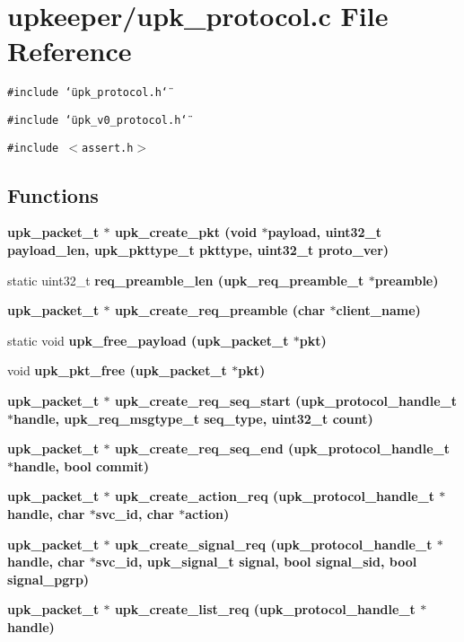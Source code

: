\section{upkeeper/upk\_\-protocol.c File Reference}
\label{upk__protocol_8c}
{\tt \#include \char`\"{}upk\_\-protocol.h\char`\"{}}\par
{\tt \#include \char`\"{}upk\_\-v0\_\-protocol.h\char`\"{}}\par
{\tt \#include $<$assert.h$>$}\par
\subsection*{Functions}
\begin{CompactItemize}
\item 
\bf{upk\_\-packet\_\-t} $\ast$ \bf{upk\_\-create\_\-pkt} (void $\ast$payload, uint32\_\-t payload\_\-len, \bf{upk\_\-pkttype\_\-t} pkttype, uint32\_\-t proto\_\-ver)
\item 
static uint32\_\-t \bf{req\_\-preamble\_\-len} (\bf{upk\_\-req\_\-preamble\_\-t} $\ast$preamble)
\item 
\bf{upk\_\-packet\_\-t} $\ast$ \bf{upk\_\-create\_\-req\_\-preamble} (char $\ast$client\_\-name)
\item 
static void \bf{upk\_\-free\_\-payload} (\bf{upk\_\-packet\_\-t} $\ast$pkt)
\item 
void \bf{upk\_\-pkt\_\-free} (\bf{upk\_\-packet\_\-t} $\ast$pkt)
\item 
\bf{upk\_\-packet\_\-t} $\ast$ \bf{upk\_\-create\_\-req\_\-seq\_\-start} (\bf{upk\_\-protocol\_\-handle\_\-t} $\ast$handle, \bf{upk\_\-req\_\-msgtype\_\-t} seq\_\-type, uint32\_\-t count)
\item 
\bf{upk\_\-packet\_\-t} $\ast$ \bf{upk\_\-create\_\-req\_\-seq\_\-end} (\bf{upk\_\-protocol\_\-handle\_\-t} $\ast$handle, bool commit)
\item 
\bf{upk\_\-packet\_\-t} $\ast$ \bf{upk\_\-create\_\-action\_\-req} (\bf{upk\_\-protocol\_\-handle\_\-t} $\ast$handle, char $\ast$svc\_\-id, char $\ast$action)
\item 
\bf{upk\_\-packet\_\-t} $\ast$ \bf{upk\_\-create\_\-signal\_\-req} (\bf{upk\_\-protocol\_\-handle\_\-t} $\ast$handle, char $\ast$svc\_\-id, \bf{upk\_\-signal\_\-t} signal, bool signal\_\-sid, bool signal\_\-pgrp)
\item 
\bf{upk\_\-packet\_\-t} $\ast$ \bf{upk\_\-create\_\-list\_\-req} (\bf{upk\_\-protocol\_\-handle\_\-t} $\ast$handle)

\end{CompactItemize}
